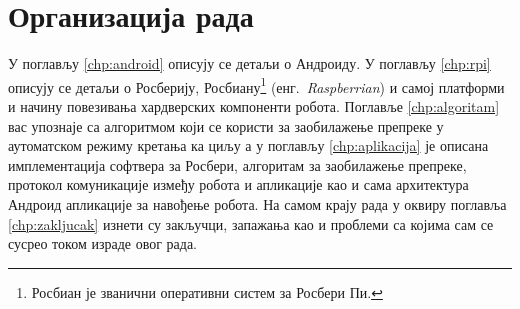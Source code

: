 \documentclass[12pt,oneside]{memoir}
\theoremstyle{remark}
\begin{document}
\section{Организација рада}
У поглављу \ref{chp:android} описују се детаљи о Андроиду. У поглављу \ref{chp:rpi} описују се детаљи о Росберију, Росбиану\footnote{Росбиан је званични оперативни систем за Росбери Пи.} (енг.~{\em Raspberrian}) и самој платформи и начину повезивања хардверских компоненти робота. Поглавље  \ref{chp:algoritam} вас упознаје са алгоритмом који се користи за заобилажење препреке у аутоматском режиму кретања ка циљу а у поглављу \ref{chp:aplikacija} је описана имплементација софтвера за Росбери, алгоритам за заобилажење препреке, протокол комуникације између робота и апликације као и сама архитектура Андроид апликације за навођење робота. На самом крају рада у оквиру поглавља \ref{chp:zakljucak} изнети су закључци, запажања као и проблеми са којима сам се сусрео током израде овог рада.





\end{document}
